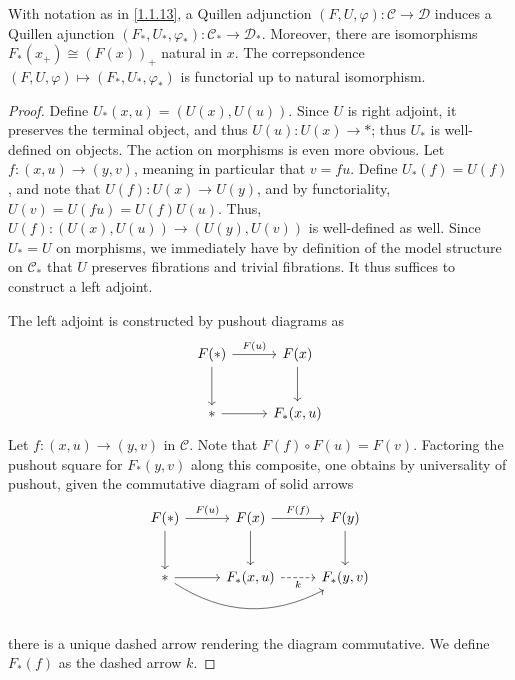 \begin{proposition}\label{3.1.13}
	With notation as in \cref{1.1.13}, a Quillen adjunction $(F,U,\varphi): \mathcal{C}  \to \mathcal{D} $ induces a Quillen ajunction $(F_*,U_*,\varphi_*): \mathcal{C} _* \to \mathcal{D}_* $. Moreover, there are isomorphisms $F_*(x_+)\cong (F(x))_+$ natural in $x$. The correpsondence $(F,U,\varphi)\mapsto (F_*,U_*,\varphi_*)$ is functorial up to natural isomorphism.
\end{proposition}
\begin{proof}
	Define $U_*(x,u)=(U(x),U(u))$. Since $U$ is right adjoint, it preserves the terminal object, and thus $U(u): U(x) \to *$; thus $U_*$ is well-defined on objects. The action on morphisms is even more obvious. Let $f : (x,u) \to (y,v)$, meaning in particular that $v=fu$. Define $U_*(f)=U(f)$, and note that $U(f): U(x) \to U(y)$, and by functoriality, $U(v)=U(fu)=U(f)U(u)$. Thus, $U(f): (U(x),U(u)) \to (U(y),U(v))$ is well-defined as well. Since $U_*=U$ on morphisms, we immediately have by definition of the model structure on $\mathcal{C} _*$ that $U$ preserves fibrations and trivial fibrations. It thus suffices to construct a left adjoint.

	The left adjoint is constructed by pushout diagrams as
	\[\begin{tikzcd}[row sep = 2.5em, column sep = 2.5em]
	F(*)\ar[" F(u) ", r] \ar[d]  & F(x)\ar[d]  \\
	* \ar[r]  & F_*(x,u)
	\end{tikzcd}\]
	Let $f : (x,u) \to (y,v)$ in $\mathcal{C} $. Note that $F(f)\circ F(u)=F(v)$. Factoring the pushout square for $F_*(y,v)$ along this composite, one obtains by universality of pushout, given the commutative diagram of solid arrows
	\[\begin{tikzcd}[row sep = 2.5em, column sep = 2.5em]
	F(*)\ar[d] \ar[" F(u) ", r]  & F(x)\ar[" F(f) ", r] \ar[d] & F(y) \ar[d] \\
	* \ar[r] \ar[bend right, rr]  & F_*(x,u)\ar[" k "', dashed, r] & F_*(y,v) \\
	\end{tikzcd}\]
	there is a unique dashed arrow rendering the diagram commutative. We define $F_*(f)$ as the dashed arrow $k$.


\end{proof}
